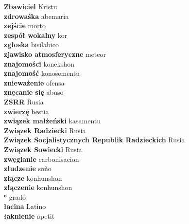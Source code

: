 \textbf{ Zbawiciel  } Kristu \\
\textbf{ zdrowaśka  } abemaria \\
\textbf{ zejście  } morto \\
\textbf{ zespół wokalny  } kor \\
\textbf{ zgłoska  } bisilabico \\
\textbf{ zjawisko atmosferyczne  } meteor \\
\textbf{ znajomości  } konekshon \\
\textbf{ znajomość  } konosementu \\
\textbf{ znieważenie  } ofensa \\
\textbf{ znęcanie się  } abuso \\
\textbf{ ZSRR  } Rusia \\
\textbf{ zwierzę  } bestia \\
\textbf{ związek małżeński  } kasamentu \\
\textbf{ Związek Radziecki  } Rusia \\
\textbf{ Związek Socjalistycznych Republik Radzieckich  } Rusia \\
\textbf{ Związek Sowiecki  } Rusia \\
\textbf{ zwęglanie  } carbonisacion \\
\textbf{ złudzenie  } soño \\
\textbf{ złącze  } konhunshon \\
\textbf{ złączenie  } konhunshon \\
\textbf{ °  } grado \\
\textbf{ łacina  } Latino \\
\textbf{ łaknienie  } apetit \\
